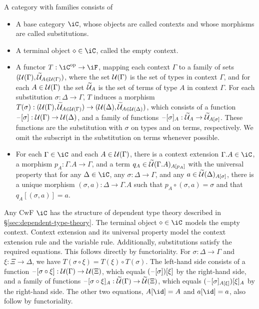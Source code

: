 \documentclass{amsart}
\begin{document}
\begin{defn}
  A category with families consists of
  \begin{itemize}
  \item A base category $\iC$, whose objects are called contexts and whose morphisms are called substitutions.
  \item A terminal object $\diamond \in \iC$, called the empty context.
  \item A functor $T : \iC\op \to \iF$, mapping each context $\Gamma$ to a family of sets $(\mathcal{U}(\Gamma), \widetilde{\mathcal{U}}_{A \in \mathcal{U}(\Gamma)})$, where the set $\mathcal{U}(\Gamma)$ is the set of types in context $\Gamma$, and for each $A \in \mathcal{U}(\Gamma)$ the set $\widetilde{\mathcal{U}}_{A}$ is the set of terms of type $A$ in context $\Gamma$.
    For each substitution $\sigma : \Delta \to \Gamma$, $T$ induces a morphism $T(\sigma) : (\mathcal{U}(\Gamma), \widetilde{\mathcal{U}}_{A \in \mathcal{U}(\Gamma)}) \to (\mathcal{U}(\Delta), \widetilde{\mathcal{U}}_{A \in \mathcal{U}(\Delta)})$, which consists of a function $\mathord{\hspace{1pt}\text{--}\hspace{1pt}}[\sigma] : \mathcal{U}(\Gamma) \to \mathcal{U}(\Delta)$, and a family of functions $\mathord{\hspace{1pt}\text{--}\hspace{1pt}}[\sigma]_{A} : \widetilde{\mathcal{U}}_{A} \to \widetilde{\mathcal{U}}_{A[\sigma]}$.
    These functions are the substitution with $\sigma$ on types and on terms, respectively.
    We omit the subscript in the substitution on terms whenever possible.
  \item For each $\Gamma \in \iC$ and each $A \in \mathcal{U}(\Gamma)$, there is a context extension $\Gamma.A \in \iC$, a morphism $p_{A} : \Gamma.A \to \Gamma$, and a term $q_{A} \in \widetilde{\mathcal{U}}(\Gamma.A)_{A[p_{A}]}$ with the universal property that for any $\Delta \in \iC$, any $\sigma : \Delta \to \Gamma$, and any $a \in \widetilde{\mathcal{U}}(\Delta)_{A[\sigma]}$, there is a unique morphism $(\sigma, a) : \Delta \to \Gamma.A$ such that $p_{A} \circ (\sigma, a) = \sigma$ and that $q_{A}[(\sigma, a)] = a$.
    
  \end{itemize}
\end{defn}

Any CwF $\iC$ has the structure of dependent type theory described in \S \ref{sec:dependent-type-theory}.
The terminal object $\diamond \in \iC$ models the empty context.
Context extension and its universal property model the context extension rule and the variable rule.
Additionally, substitutions satisfy the required equations.
This follows directly by functoriality.
For $\sigma : \Delta \to \Gamma$ and $\xi : \Xi \to \Delta$, we have $T(\sigma \circ \xi) = T(\xi) \circ T(\sigma)$.
The left-hand side consists of a function $\mathord{\hspace{1pt}\text{--}\hspace{1pt}}[\sigma \circ \xi] : \mathcal{U}(\Gamma) \to \mathcal{U}(\Xi)$, which equals $(\mathord{\hspace{1pt}\text{--}\hspace{1pt}}[\sigma])[\xi]$ by the right-hand side, and a family of functions $\mathord{\hspace{1pt}\text{--}\hspace{1pt}}[\sigma \circ \xi]_{A} : \widetilde{\mathcal{U}}(\Gamma) \to \widetilde{\mathcal{U}}(\Xi)$, which equals $(\mathord{\hspace{1pt}\text{--}\hspace{1pt}}[\sigma]_{A[\xi]})[\xi]_{A}$ by the right-hand side.
The other two equations, $A[\id] = A$ and $a[\id] = a$, also follow by functoriality.
\end{document}
